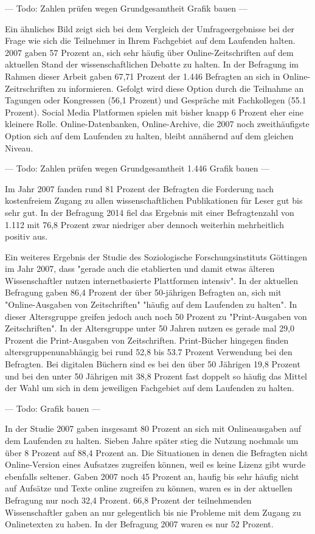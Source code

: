 --- Todo: Zahlen prüfen wegen Grundgesamtheit Grafik bauen ---

Ein ähnliches Bild zeigt sich bei dem Vergleich der Umfrageergebnisse bei der Frage wie sich die Teilnehmer in Ihrem Fachgebiet auf dem Laufenden halten. 2007 gaben 57 Prozent an, sich sehr häufig über Online-Zeitschriften auf dem aktuellen Stand der wissenschaftlichen Debatte zu halten. In der Befragung im Rahmen dieser Arbeit gaben 67,71 Prozent der 1.446 Befragten an sich in Online-Zeitrschriften zu informieren. Gefolgt wird diese Option durch die Teilnahme an Tagungen oder Kongressen (56,1 Prozent) und Gespräche mit Fachkollegen (55.1 Prozent). Social Media Platformen spielen mit bisher knapp 6 Prozent eher eine kleinere Rolle. Online-Datenbanken, Online-Archive, die 2007 noch zweithäufigste Option sich auf dem Laufenden zu halten, bleibt annähernd auf dem gleichen Niveau.

--- Todo: Zahlen prüfen wegen Grundgesamtheit 1.446 Grafik bauen ---

Im Jahr 2007 fanden rund 81 Prozent der Befragten die Forderung nach kostenfreiem Zugang zu allen wissenschaftlichen Publikationen für Leser gut bis sehr gut. In der Befragung 2014 fiel das Ergebnis mit einer Befragtenzahl von 1.112 mit 76,8 Prozent zwar niedriger aber dennoch weiterhin mehrheitlich positiv aus.

Ein weiteres Ergebnis der Studie des Soziologische Forschungsinstituts Göttingen im Jahr 2007, dass "gerade auch die etablierten und damit etwas älteren Wissenschaftler nutzen internetbasierte Plattformen intensiv". In der aktuellen Befragung gaben 86,4 Prozent der über 50-jährigen Befragten an, sich mit "Online-Ausgaben von Zeitschriften" "häufig auf dem Laufenden zu halten". In dieser Altersgruppe greifen jedoch auch noch 50 Prozent zu "Print-Ausgaben von Zeitschriften". In der Altersgruppe unter 50 Jahren nutzen es gerade mal 29,0 Prozent die Print-Ausgaben von Zeitschriften. Print-Bücher hingegen finden altersgruppenunabhängig bei rund 52,8 bis 53.7 Prozent Verwendung bei den Befragten. Bei digitalen Büchern sind es bei den über 50 Jährigen 19,8 Prozent und bei den unter 50 Jährigen mit 38,8 Prozent fast doppelt so häufig das Mittel der Wahl um sich in dem jeweiligen Fachgebiet auf dem Laufenden zu halten.

--- Todo: Grafik bauen ---

In der Studie 2007 gaben insgesamt 80 Prozent an sich mit Onlineausgaben auf dem Laufenden zu halten. Sieben Jahre später stieg die Nutzung nochmals um über 8 Prozent auf 88,4 Prozent an. Die Situationen in denen die Befragten nicht Online-Version eines Aufsatzes zugreifen können, weil es keine Lizenz gibt wurde ebenfalls seltener. Gaben 2007 noch 45 Prozent an, haufig bis sehr häufig nicht auf Aufsätze und Texte online zugreifen zu können, waren es in der aktuellen Befragung nur noch 32,4 Prozent. 66,8 Prozent der teilnehmenden Wissenschaftler gaben an nur gelegentlich bis nie Probleme mit dem Zugang zu Onlinetexten zu haben. In der Befragung 2007 waren es nur 52 Prozent.

